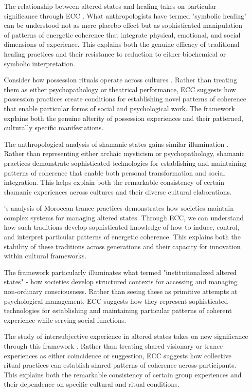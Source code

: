 The relationship between altered states and healing takes on particular significance through ECC \cite{csordas2002body}. What anthropologists have termed "symbolic healing" can be understood not as mere placebo effect but as sophisticated manipulation of patterns of energetic coherence that integrate physical, emotional, and social dimensions of experience. This explains both the genuine efficacy of traditional healing practices and their resistance to reduction to either biochemical or symbolic interpretation.

Consider how possession rituals operate across cultures \cite{boddy1994spirit}. Rather than treating them as either psychopathology or theatrical performance, ECC suggests how possession practices create conditions for establishing novel patterns of coherence that enable particular forms of social and psychological work. The framework explains both the genuine alterity of possession experiences and their patterned, culturally specific manifestations.

The anthropological analysis of shamanic states gains similar illumination \cite{noll1983shamanism}. Rather than representing either archaic mysticism or psychopathology, shamanic practices demonstrate sophisticated technologies for establishing and maintaining patterns of coherence that enable both personal transformation and social integration. This helps explain both the remarkable consistency of certain shamanic experiences across cultures and their diverse cultural elaborations.

\cite{crapanzano1973hamadsha}'s analysis of Moroccan trance practices demonstrates how societies maintain complex systems for managing altered states. Through ECC, we can understand how such traditions develop sophisticated knowledge of how to induce, control, and interpret particular patterns of energetic coherence. This explains both the stability of these traditions across generations and their capacity for innovation within cultural frameworks.

The framework particularly illuminates what \cite{bourguignon1976possession} termed "institutionalized altered states" - how societies develop structured contexts for accessing and managing non-ordinary consciousness. Rather than seeing these as primitive attempts at psychological management, ECC suggests how they represent sophisticated technologies for establishing and maintaining particular patterns of coherent experience while serving social functions.

The study of intersubjective experience in altered states takes on new significance through this framework \cite{rouget1985music}. Rather than treating shared visionary or trance experiences as either coincidence or suggestion, ECC suggests how collective ritual practices can establish shared patterns of coherence across participants. This explains both the remarkable consistency of certain group experiences and their dependence on specific cultural and ritual conditions.

